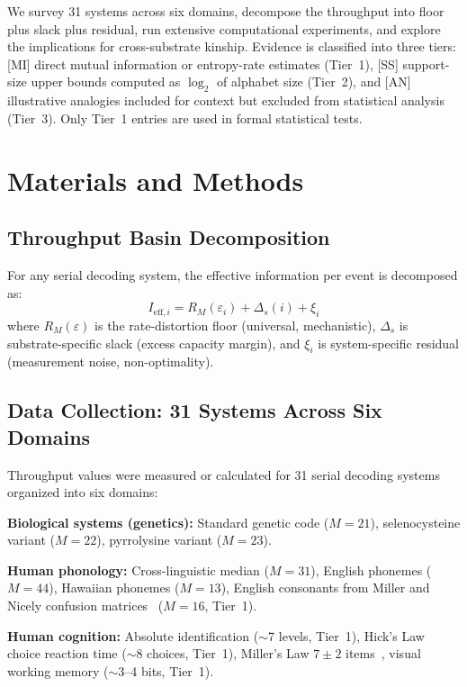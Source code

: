 \documentclass[11pt]{article}
\begin{document}
We survey 31 systems across six domains, decompose the throughput into floor plus slack plus residual, run extensive computational experiments, and explore the implications for cross-substrate kinship. Evidence is classified into three tiers: [MI] direct mutual information or entropy-rate estimates (Tier~1), [SS] support-size upper bounds computed as $\log_2$ of alphabet size (Tier~2), and [AN] illustrative analogies included for context but excluded from statistical analysis (Tier~3). Only Tier~1 entries are used in formal statistical tests.

\section{Materials and Methods}

\subsection{Throughput Basin Decomposition}

For any serial decoding system, the effective information per event is decomposed as:
\begin{equation}
    I_{\mathrm{eff},i} = R_M(\varepsilon_i) + \Delta_s(i) + \xi_i
\end{equation}
where $R_M(\varepsilon)$ is the rate-distortion floor (universal, mechanistic), $\Delta_s$ is substrate-specific slack (excess capacity margin), and $\xi_i$ is system-specific residual (measurement noise, non-optimality).

\subsection{Data Collection: 31 Systems Across Six Domains}

Throughput values were measured or calculated for 31 serial decoding systems organized into six domains:

\textbf{Biological systems (genetics):} Standard genetic code ($M = 21$), selenocysteine variant ($M = 22$), pyrrolysine variant ($M = 23$).

\textbf{Human phonology:} Cross-linguistic median ($M = 31$), English phonemes ($M = 44$), Hawaiian phonemes ($M = 13$), English consonants from Miller and Nicely confusion matrices~\cite{millernicely1955} ($M = 16$, Tier~1).

\textbf{Human cognition:} Absolute identification ($\sim$7 levels, Tier~1), Hick's Law choice reaction time ($\sim$8 choices, Tier~1), Miller's Law $7 \pm 2$ items~\cite{miller1956}, visual working memory ($\sim$3--4 bits, Tier~1).
\end{document}
